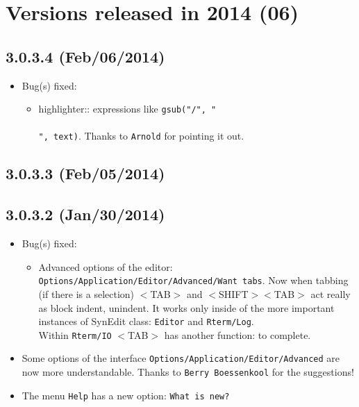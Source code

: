 
\hypertarget{2014}{}
\section{Versions released in 2014 (06)}

\subsection*{3.0.3.4 (Feb/06/2014)}
\begin{itemize}
  \item Bug(s) fixed:
    \begin{itemize}
      \item \RR{} highlighter:: expressions like \texttt{gsub("/", "\\\\", text)}. Thanks to \texttt{Arnold} for pointing it out.
    \end{itemize}
\end{itemize}


\subsection*{3.0.3.3 (Feb/05/2014)}


\subsection*{3.0.3.2 (Jan/30/2014)}
\begin{itemize}
  \item Bug(s) fixed:
    \begin{itemize}
      \item Advanced options of the editor: \texttt{Options/Application/Editor/Advanced/Want tabs}.
       Now when tabbing (if there is a selection) $<$TAB$>$ and $<$SHIFT$>$$<$TAB$>$ act really as block indent, unindent.
       It works only inside of the more important instances of SynEdit class: \texttt{Editor} and \texttt{Rterm/Log}. \\
       Within \texttt{Rterm/IO} $<$TAB$>$ has another function: to complete.
    \end{itemize}
  \item Some options of the interface \texttt{Options/Application/Editor/Advanced} are now more understandable.
   Thanks to \texttt{Berry Boessenkool} for the suggestions!
  \item The menu \texttt{Help} has a new option: \texttt{What is new?}
\end{itemize}


